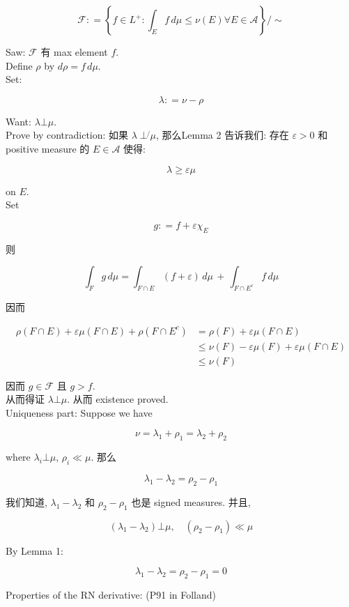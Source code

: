 \[\mathcal{F}: = \left\{ {f \in L^{+}:\int_{E}f\, d\mu \leq \nu(E)\forall E \in \mathcal{A}} \right\}/ \sim\]

Saw: \(\mathcal{F}\) 有 max element \(f\).\\
Define \(\rho\) by \(d\rho = f\, d\mu\).\\
Set:

\[\lambda: = \nu - \rho\]

Want: \(\lambda\bot\mu\).\\
Prove by contradiction: 如果 \(\lambda\operatorname{\perp\not{}}\mu\), 那么Lemma 2 告诉我们: 存在 \(\varepsilon > 0\) 和 positive measure 的 \(E \in \mathcal{A}\) 使得:

\[\lambda \geq \varepsilon\mu\]

on \(E\).\\
Set

\[g: = f + \varepsilon\chi_{E}\]

则

\[\int_{F}g\, d\mu = \int_{F \cap E}(f + \varepsilon)\, d\mu\, + \,\int_{F \cap E^{c}}f\, d\mu\]

因而

\[\begin{matrix}
{\rho(F \cap E) + \varepsilon\mu(F \cap E) + \rho(F \cap E^{c})} & {= \rho(F) + \varepsilon\mu(F \cap E)} \\
 & {\leq \nu(F) - \varepsilon\mu(F) + \varepsilon\mu(F \cap E)} \\
 & {\leq \nu(F)}
\end{matrix}\]

因而 \(g \in \mathcal{F}\) 且 \(g > f\).\\
从而得证 \(\lambda\bot\mu\). 从而 existence proved.\\
Uniqueness part: Suppose we have

\[\nu = \lambda_{1} + \rho_{1} = \lambda_{2} + \rho_{2}\]

where \(\lambda_{i}\bot\mu\), \(\rho_{i} \ll \mu\). 那么

\[\lambda_{1} - \lambda_{2} = \rho_{2} - \rho_{1}\]

我们知道, \(\lambda_{1} - \lambda_{2}\) 和 \(\rho_{2} - \rho_{1}\) 也是 signed measures. 并且,

\[(\lambda_{1} - \lambda_{2})\bot\mu,\quad(\rho_{2} - \rho_{1}) \ll \mu\]

By Lemma 1:

\[\lambda_{1} - \lambda_{2} = \rho_{2} - \rho_{1} = 0\]

Properties of the RN derivative: (P91 in Folland)

